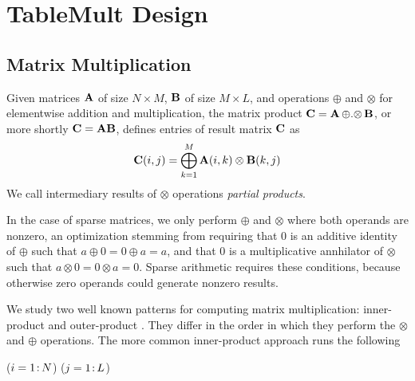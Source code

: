 
\section{TableMult Design}
\label{sDesign}


\subsection{Matrix Multiplication}
\label{sMatMul}
Given matrices $\mathbf{A}$ of size $N \times M$, $\mathbf{B}$ of size $M \times L$,
and operations $\oplus$ and $\otimes$ for elementwise addition and multiplication,
the matrix product $\mathbf{C} = \mathbf{A} \,{\oplus}.{\otimes}\, \mathbf{B} $, or more shortly $\mathbf{C} = \mathbf{A}\mathbf{B}$,
defines entries of result matrix $\mathbf{C}$ as 
\[ \mathbf{C}(i,j) = \bigoplus_{k=1}^M \mathbf{A}(i,k) \otimes \mathbf{B}(k,j) \]
We call intermediary results of $\otimes$ operations \emph{partial products}.

In the case of sparse matrices, we only perform $\oplus$ and $\otimes$ where both operands are nonzero,
an optimization stemming from requiring that 0 is an additive identity of $\oplus$ such that $a \oplus 0 = 0 \oplus a = a$,
and that 0 is a multiplicative annhilator of $\otimes$ such that $a \otimes 0 = 0 \otimes a = 0$.
Sparse arithmetic requires these conditions, because otherwise zero operands could generate nonzero results.



We study two well known patterns for computing matrix multiplication:
inner-product and outer-product \cite{kruskal1989techniques}. They differ in the order in which they perform
the $\otimes$ and $\oplus$ operations.  The more common inner-product approach runs the following %

\removelatexerror
\begin{algorithm}[H]
\vspace{\algspace}
\fore($i = 1\colon\! N$){
\fore($j = 1\colon\! L$){
}}
\vspace{\algspace}
\end{algorithm}


